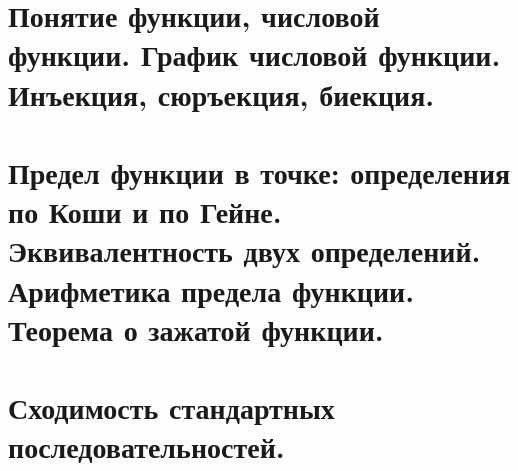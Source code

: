 \documentclass[a4paper,12pt]{article}
\begin{document}
    \subsection{}
    \subsection{}

    \newpage
    \section{Понятие функции, числовой функции. График числовой функции. Инъекция, сюръекция, биекция.}
    \subsection{}
    \subsection{}
    \subsection{}

    \newpage
    \section{Предел функции в точке: определения по Коши и по Гейне. Эквивалентность двух определений. Арифметика предела функции. Теорема о зажатой функции.}
    \subsection{}
    \subsection{}
    \subsection{}
    \subsection{}

    \newpage
    \section{Сходимость стандартных последовательностей.}
\end{document}
